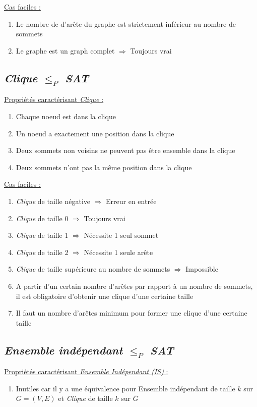   \underline{Cas faciles :}
  \begin{enumerate}
   \item Le nombre de d'arête du graphe est strictement inférieur au
	 nombre de sommets
   \item Le graphe est un graph complet $\Rightarrow$ Toujours vrai
  \end{enumerate}

  \subsection{\emph{Clique} $\leq_P$ \emph{SAT}}
  \underline{Propriétés caractérisant \emph{Clique} :}
  \begin{enumerate}
   \item Chaque noeud est dans la clique
   \item Un noeud a exactement une position dans la clique
   \item Deux sommets non voisins ne peuvent pas être ensemble dans la
	 clique
   \item Deux sommets n'ont pas la même position dans la clique
  \end{enumerate}

  \underline{Cas faciles :}
  \begin{enumerate}
   \item \emph{Clique} de taille négative $\Rightarrow$ Erreur en entrée
   \item \emph{Clique} de taille 0 $\Rightarrow$ Toujours vrai
   \item \emph{Clique} de taille 1 $\Rightarrow$ Nécessite 1 seul sommet
   \item \emph{Clique} de taille 2 $\Rightarrow$ Nécessite 1 seule arête
   \item \emph{Clique} de taille supérieure au nombre de sommets
	 $\Rightarrow$ Impossible
   \item A partir d'un certain nombre d'arêtes par rapport à un nombre
	 de sommets, il est obligatoire d'obtenir une clique d'une
	 certaine taille
   \item Il faut un nombre d'arêtes minimum pour former une clique d'une
	 certaine taille
  \end{enumerate}

  \subsection{\emph{Ensemble indépendant} $\leq_P$ \emph{SAT}}
  \underline{Propriétés caractérisant \emph{Ensemble Indépendant (IS)} :}
  \begin{enumerate}
   \item Inutiles car il y a une équivalence pour Ensemble indépendant
	 de taille $k$ sur $G = (V,E)$ et \emph{Clique} de taille $k$
	 sur $\overline{G}$
  \end{enumerate}

